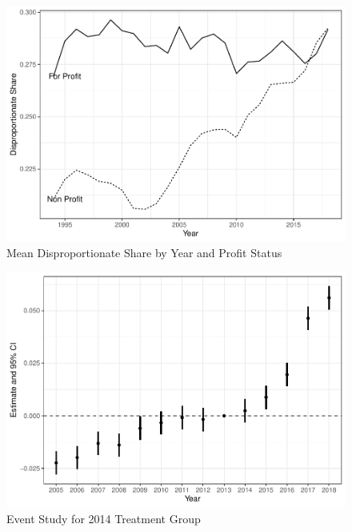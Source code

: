 \documentclass[
  12pt,
]{article}
\begin{document}
\newpage

\begin{figure}
\centering
\includegraphics{solutions_files/figure-latex/dsh-plot-1.pdf}
\caption{\label{fig:dsh-plot}Mean Disproportionate Share by Year and Profit Status}
\end{figure}

\newpage

\begin{figure}
\centering
\includegraphics{solutions_files/figure-latex/event-study1-1.pdf}
\caption{\label{fig:event-study1}Event Study for 2014 Treatment Group}
\end{figure}

\newpage
\end{document}
